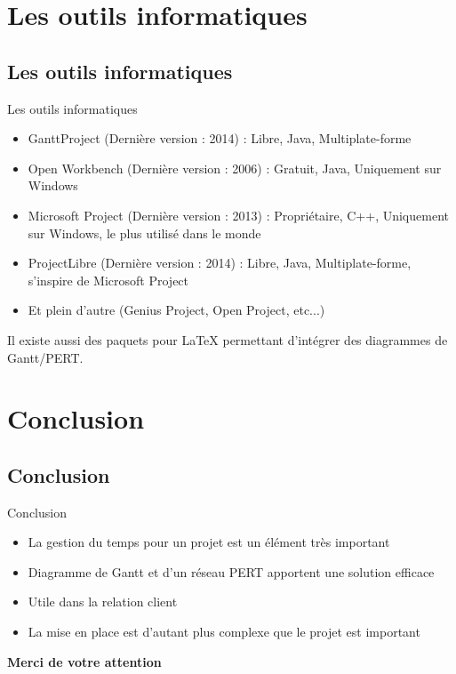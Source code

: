 \documentclass[handout]{beamer}
\begin{document}
\section{Les outils informatiques}
\subsection*{Les outils informatiques}
\begin{frame}{Les outils informatiques}
    \begin{itemize}
    \item GanttProject (Dernière version : 2014) : Libre, Java, Multiplate-forme
    \item Open Workbench (Dernière version : 2006) : Gratuit, Java, Uniquement sur Windows
    \item Microsoft Project (Dernière version : 2013) : Propriétaire, C++, Uniquement sur Windows, le plus utilisé dans le monde
    \item ProjectLibre (Dernière version : 2014) : Libre, Java, Multiplate-forme, s'inspire de Microsoft Project
    \item Et plein d'autre (Genius Project, Open Project, etc...)
    \end{itemize}
    \vspace{\baselineskip}
    Il existe aussi des paquets pour \LaTeX{} permettant d'intégrer des diagrammes de Gantt/PERT.
\end{frame}

\section{Conclusion}
\subsection*{Conclusion}
\begin{frame}{Conclusion}
    \begin{itemize}
    \item{La gestion du temps pour un projet est un élément très important}
    \item{Diagramme de Gantt et d'un réseau PERT apportent une solution efficace}
    \item{Utile dans la relation client}
    \item{La mise en place est d'autant plus complexe que le projet est important}
    \end{itemize}
\end{frame}

\begin{frame}{}
    \centering
    \textbf{Merci de votre attention}
\end{frame}
\end{document}
